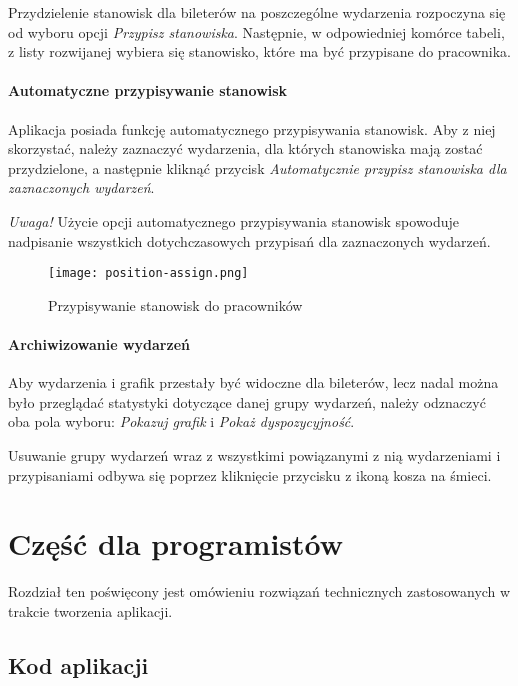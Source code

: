 \documentclass[shortabstract]{iithesis}
\begin{document}
Przydzielenie stanowisk dla bileterów na poszczególne wydarzenia rozpoczyna się od wyboru opcji \textit{Przypisz stanowiska}. Następnie, w odpowiedniej komórce tabeli, z listy rozwijanej wybiera się stanowisko, które ma być przypisane do pracownika.

\subsubsection{Automatyczne przypisywanie stanowisk}

Aplikacja posiada funkcję automatycznego przypisywania stanowisk. Aby z niej skorzystać, należy zaznaczyć wydarzenia, dla których stanowiska mają zostać przydzielone, a następnie kliknąć przycisk \textit{Automatycznie przypisz stanowiska dla zaznaczonych wydarzeń}.

\textit{Uwaga!} Użycie opcji automatycznego przypisywania stanowisk spowoduje nadpisanie wszystkich dotychczasowych przypisań dla zaznaczonych wydarzeń.

\begin{figure}[H]
    \centering
    \texttt{[image: position-assign.png]}
    \caption{Przypisywanie stanowisk do pracowników}
    \label{fig:enter-label}
\end{figure}

\subsubsection{Archiwizowanie wydarzeń}

Aby wydarzenia i grafik przestały być widoczne dla bileterów, lecz nadal można było przeglądać statystyki dotyczące danej grupy wydarzeń, należy odznaczyć oba pola wyboru: \textit{Pokazuj grafik} i \textit{Pokaż dyspozycyjność}.

Usuwanie grupy wydarzeń wraz z wszystkimi powiązanymi z nią wydarzeniami i przypisaniami odbywa się poprzez kliknięcie przycisku z ikoną kosza na śmieci.

\chapter{Część dla programistów}

Rozdział ten poświęcony jest omówieniu rozwiązań technicznych zastosowanych w trakcie tworzenia aplikacji.

\section{Kod aplikacji}
\end{document}
